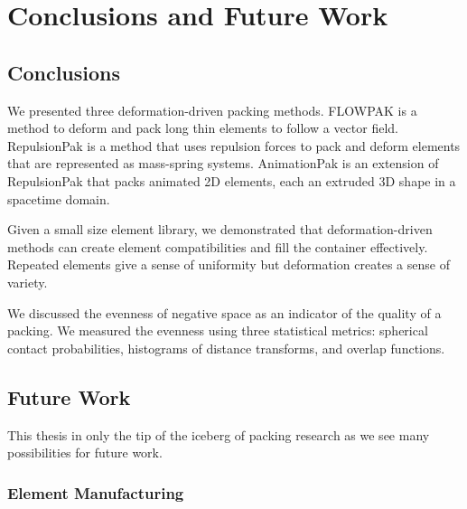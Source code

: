
\chapter{Conclusions and Future Work}
\label{chapter_conclusions_and_future_work}

\section{Conclusions}

\newtext
{
We presented three deformation-driven packing methods.
FLOWPAK is a method to deform and pack long thin elements to follow a vector field.
RepulsionPak is a method that uses repulsion forces to pack and deform
elements that are represented as mass-spring systems.
AnimationPak is an extension of RepulsionPak that packs animated 2D elements,
each an extruded 3D shape in a spacetime domain.
}

\newtext
{
Given a small size element library, 
we demonstrated that deformation-driven methods can create element compatibilities
and fill the container effectively.
Repeated elements give a sense of uniformity but deformation creates a sense of variety.
}

\newtext
{
We discussed the evenness of negative space as an indicator of the quality of a packing.
We measured the evenness using three statistical metrics:
spherical contact probabilities, histograms of distance transforms, and overlap functions.
}

\section{Future Work}

\newtext
{
This thesis in only the tip of the iceberg of packing research as
we see many possibilities for future work.
}


\subsection{Element Manufacturing}

